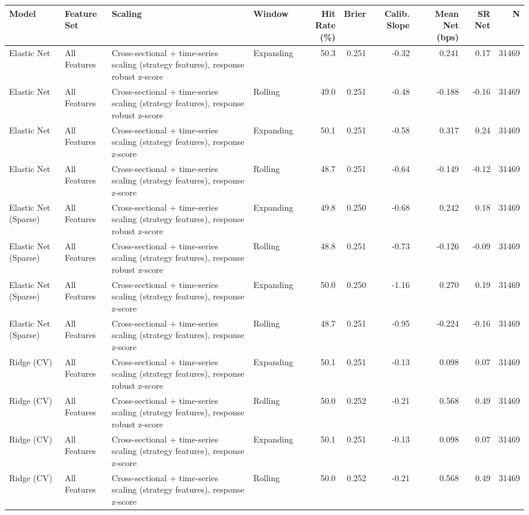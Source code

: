 \begin{tabular}{llllrrrrrr}
\toprule
Model & Feature Set & Scaling & Window & Hit Rate (\%) & Brier & Calib. Slope & Mean Net (bps) & SR Net & N \\
\midrule
Elastic Net & All Features & Cross-sectional + time-series scaling (strategy features), response robust z-score & Expanding & 50.3 & 0.251 & -0.32 & 0.241 & 0.17 & 31469 \\
Elastic Net & All Features & Cross-sectional + time-series scaling (strategy features), response robust z-score & Rolling & 49.0 & 0.251 & -0.48 & -0.188 & -0.16 & 31469 \\
Elastic Net & All Features & Cross-sectional + time-series scaling (strategy features), response z-score & Expanding & 50.1 & 0.251 & -0.58 & 0.317 & 0.24 & 31469 \\
Elastic Net & All Features & Cross-sectional + time-series scaling (strategy features), response z-score & Rolling & 48.7 & 0.251 & -0.64 & -0.149 & -0.12 & 31469 \\
Elastic Net (Sparse) & All Features & Cross-sectional + time-series scaling (strategy features), response robust z-score & Expanding & 49.8 & 0.250 & -0.68 & 0.242 & 0.18 & 31469 \\
Elastic Net (Sparse) & All Features & Cross-sectional + time-series scaling (strategy features), response robust z-score & Rolling & 48.8 & 0.251 & -0.73 & -0.126 & -0.09 & 31469 \\
Elastic Net (Sparse) & All Features & Cross-sectional + time-series scaling (strategy features), response z-score & Expanding & 50.0 & 0.250 & -1.16 & 0.270 & 0.19 & 31469 \\
Elastic Net (Sparse) & All Features & Cross-sectional + time-series scaling (strategy features), response z-score & Rolling & 48.7 & 0.251 & -0.95 & -0.224 & -0.16 & 31469 \\
Ridge (CV) & All Features & Cross-sectional + time-series scaling (strategy features), response robust z-score & Expanding & 50.1 & 0.251 & -0.13 & 0.098 & 0.07 & 31469 \\
Ridge (CV) & All Features & Cross-sectional + time-series scaling (strategy features), response robust z-score & Rolling & 50.0 & 0.252 & -0.21 & 0.568 & 0.49 & 31469 \\
Ridge (CV) & All Features & Cross-sectional + time-series scaling (strategy features), response z-score & Expanding & 50.1 & 0.251 & -0.13 & 0.098 & 0.07 & 31469 \\
Ridge (CV) & All Features & Cross-sectional + time-series scaling (strategy features), response z-score & Rolling & 50.0 & 0.252 & -0.21 & 0.568 & 0.49 & 31469 \\

\end{tabular}
